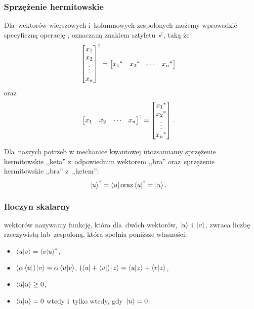 \subsubsection{Sprzężenie hermitowskie}
Dla~wektorów wierszowych i~kolumnowych zespolonych możemy wprowadzić specyficzną
operację , oznaczaną znakiem sztyletu~$\square^\dagger$, taką że
$$
	\begin{bmatrix}
		x_1    \\
		x_2    \\
		\vdots \\
		x_{n}  \\
	\end{bmatrix}^\dagger
	=
	\begin{bmatrix}
		{x_1}^* &
		{x_2}^* &
		\cdots     &
		{x_{n}}^*
	\end{bmatrix}
$$
oraz
$$
	\begin{bmatrix}
		x_1    &
		x_2    &
		\cdots &
		x_{n}
	\end{bmatrix}^\dagger
	=
	\begin{bmatrix}
		{x_1}^*   \\
		{x_2}^*   \\
		\vdots       \\
		{x_{n}}^* \\
	\end{bmatrix}.
$$

Dla~naszych potrzeb w mechanice kwantowej utożsamiamy sprzężenie hermitowskie
,,keta'' z~odpowiednim wektorem ,,bra'' oraz~sprzężenie hermitowskie ,,bra'' z~,,ketem'':
$$
	\ket{u}^\dagger = \bra{u} \text{oraz} \bra{u}^\dagger = \ket{u}.
$$

\subsubsection{Iloczyn skalarny}
 wektorów nazywamy funkcję,
która dla~dwóch wektorów, $\ket{u}$ i~$\ket{v}$, zwraca liczbę rzeczywistą lub~zespoloną,
która spełnia poniższe własności:

\begin{itemize}
	\item $\braket{u}{v}={\braket{v}{u}}^*$,
	\item  $(\alpha\bra{u})\ket{v} = \alpha\braket{u}{v}$,
	      $(\bra{u}+\bra{v})\ket{z}=\braket{u}{z}+\braket{v}{z}$,
	\item $\braket{u}{u}\geq 0$,
	\item $\braket{u}{u} = 0$ wtedy i~tylko wtedy, gdy~$\ket{u}=0$.
\end{itemize}


